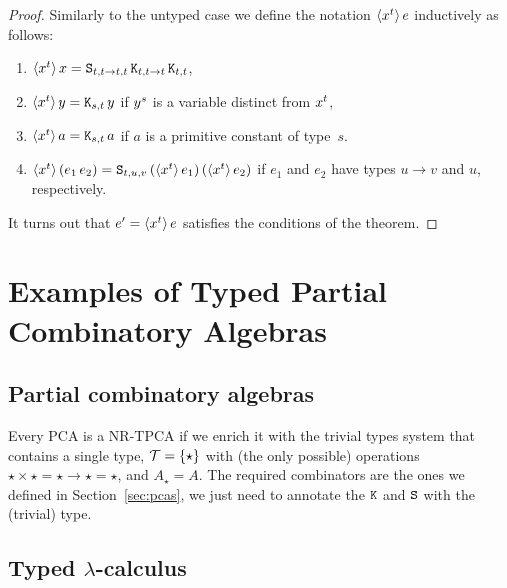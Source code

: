 \begin{proof}
  Similarly to the untyped case we define the notation
  $\langle x^{t} \rangle\,e$ inductively as follows:
  \begin{enumerate}
  \item $\langle x^{t} \rangle\,x = \mathtt{S}_{t,t \to t,t} \, \mathtt{K}_{t,t \to
      t} \, \mathtt{K}_{t,t}$,
  \item $\langle x^{t} \rangle\,y = \mathtt{K}_{s,t}\, y$ if $y^{s}$ is a
    variable distinct from $x^{t}$,
  \item $\langle x^{t} \rangle\,a = \mathtt{K}_{s,t} \, a$ if $a$ is a primitive
    constant of type~$s$.
  \item $\langle x^{t} \rangle\,(e_1\, e_2) = \mathtt{S}_{t,u,v}\,
    (\langle x^{t} \rangle\,e_1) \, (\langle x^{t} \rangle\,e_2)$ if $e_1$ and
    $e_2$ have types $u \to v$ and $u$, respectively.
  \end{enumerate}
  It turns out that $e' = \langle x^{t} \rangle\,e$ satisfies the conditions
  of the theorem.
\end{proof}

\section{Examples of Typed Partial Combinatory Algebras}
\label{sec:examples-tpcas}

\subsection{Partial combinatory algebras}

Every PCA is a NR-TPCA if we enrich it with the trivial types system
that contains a single type, $\mathcal{T} = \{\star\}$ with (the
only possible) operations $\star \times \star = \star \to \star =
\star$, and $A_\star = A$. The required combinators are the ones we
defined in Section~\ref{sec:pcas}, we just need to annotate the
$\mathtt{K}$ and $\mathtt{S}$ with the (trivial) type.


\subsection{Typed $\lambda$-calculus}
\label{sec:typed-lambda-calculus}

